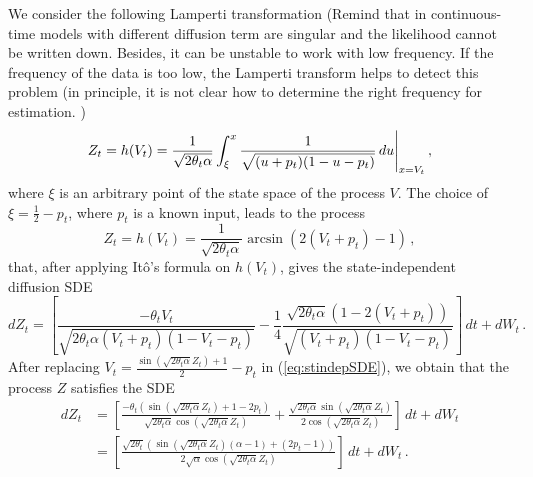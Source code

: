 \documentclass[11pt]{article}
\theoremstyle{definition}
\begin{document}
We consider the following Lamperti transformation  {\color{red} (Remind that in continuous-time models with different diffusion term are singular and the likelihood cannot be written down. Besides, it can be unstable to work with low frequency. If the frequency of the data is too low, the Lamperti transform helps to detect this problem (in principle, it is not clear how to determine the right frequency for estimation. )}
\begin{equation}
Z_t = h(V_t) = \frac{1}{\sqrt{2 \theta_t \alpha}} \int_{\xi}^{x} \frac{1}{\sqrt{(u + p_t)(1 - u - p_t)}} \,du \Bigg{\vert}_{x = V_t} \,,
\end{equation}
where $\xi$ is an arbitrary point of the state space of the process $V$. The choice of $\xi = \frac{1}{2} - p_t$, where $p_t$ is a known input, leads to the process 
\begin{equation}
Z_t = h(V_t) = \frac{1}{\sqrt{2 \theta_t \alpha}} \arcsin (2(V_t + p_t) -1)\,,
\end{equation}
that, after applying It\^{o}'s formula on $h(V_t)$, gives the state-independent diffusion SDE
\begin{equation}
dZ_t = \left[  \frac{- \theta_t V_t}{ \sqrt{2 \theta_t \alpha (V_t + p_t)(1 - V_t - p_t)}} - \frac{1}{4} \frac{\sqrt{2 \theta_t \alpha} \left( 1 - 2 (V_t + p_t)\right)}{\sqrt{(V_t + p_t)(1 - V_t - p_t)}}  \right] \,dt + dW_t \,. \label{eq:stindepSDE}
\end{equation}
After replacing $V_t = \frac{\sin(\sqrt{2 \theta_t \alpha} Z_t) + 1}{2} - p_t$ in (\ref{eq:stindepSDE}), we obtain that the  process $Z$ satisfies the SDE
\begin{align}
dZ_t & = \left[ \frac{- \theta_t (\sin(\sqrt{2 \theta_t \alpha} Z_t) + 1 - 2 p_t)}{\sqrt{2 \theta_t \alpha} \cos{(\sqrt{2 \theta_t \alpha} Z_t)}} + \frac{\sqrt{2 \theta_t \alpha} \sin{(\sqrt{2 \theta_t \alpha} Z_t)}}{2 \cos{(\sqrt{2 \theta_t \alpha} Z_t)}} \right] \,dt + dW_t \nonumber \\
&  = \left[  \frac{\sqrt{2 \theta_t} \left( \sin(\sqrt{2 \theta_t \alpha} Z_t) (\alpha - 1) + (2 p_t -1 ) \right)}{2 \sqrt{\alpha} \cos{(\sqrt{2 \theta_t \alpha} Z_t)}}  \right] \,dt + dW_t \,. 
\end{align}


\end{document}
